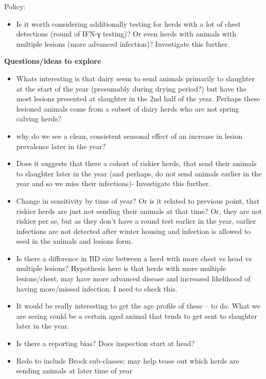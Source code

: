 \documentclass[
  letterpaper,
  DIV=11,
  numbers=noendperiod]{scrreprt}
\providecommand{\tightlist}{%
  \setlength{\itemsep}{0pt}\setlength{\parskip}{0pt}}
\begin{document}
Policy:

\begin{itemize}
\tightlist
\item
  Is it worth considering additionally testing for herds with a lot of
  chest detections (round of IFN-γ testing)? Or even herds with animals
  with multiple lesions (more advanced infection)? Investigate this
  further.
\end{itemize}

\textbf{Questions/ideas to explore}

\begin{itemize}
\tightlist
\item
  Whats interesting is that dairy seem to send animals primarily to
  slaughter at the start of the year (presumably during drying period?)
  but have the most lesions presented at slaughter in the 2nd half of
  the year. Perhaps these lesioned animals come from a subset of dairy
  herds who are not spring calving herds?
\item
  why do we see a clean, consistent seasonal effect of an increase in
  lesion prevalence later in the year?
\item
  Does it suggests that there a cohort of riskier herds, that send their
  animals to slaughter later in the year (and perhaps, do not send
  animals earlier in the year and so we miss their infections)-
  Investigate this further.
\item
  Change in sensitivity by time of year? Or is it related to previous
  point, that riskier herds are just not sending their animals at that
  time? Or, they are not riskier per se, but as they don't have a round
  test earlier in the year, earlier infections are not detected after
  winter housing and infection is allowed to seed in the animals and
  lesions form.
\item
  Is there a difference in BD size between a herd with more chest vs
  head vs multiple lesions? Hypothesis here is that herds with more
  multiple lesions/chest, may have more advanced disease and increased
  likelihood of having more/missed infection. I need to check this.
\item
  It would be really interesting to get the age profile of these -- to
  do. What we are seeing could be a certain aged animal that tends to
  get sent to slaughter later in the year.
\item
  Is there a reporting bias? Does inspection start at head?
\item
  Redo to include Brock sub-classes: may help tease out which herds are
  sending animals at later time of year
\end{itemize}
\end{document}
